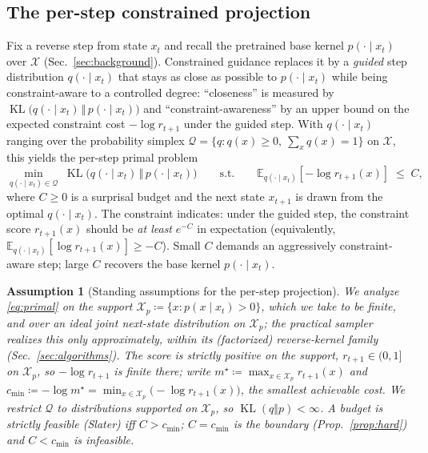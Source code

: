 \documentclass{article}
\newtheorem{assumption}{Assumption}
\DeclareMathOperator{\KL}{KL}
\newcommand{\E}{\mathbb{E}}
\newcommand{\X}{\mathcal{X}}
\newcommand{\Q}{\mathcal{Q}}
\begin{document}
\subsection{The per-step constrained projection}
\label{sec:perstep}
Fix a reverse step from state $x_t$ and recall the pretrained base kernel $p(\cdot\mid x_t)$ over $\X$ (Sec.~\ref{sec:background}). Constrained guidance replaces it by a \emph{guided} step distribution $q(\cdot\mid x_t)$ that stays as close as possible to $p(\cdot\mid x_t)$ while being constraint-aware to a controlled degree: ``closeness'' is measured by $\KL\big(q(\cdot\mid x_t)\,\Vert\,p(\cdot\mid x_t)\big)$ and ``constraint-awareness'' by an upper bound on the expected constraint cost $-\log r_{t+1}$ under the guided step. With $q(\cdot\mid x_t)$ ranging over the probability simplex $\Q=\{q:q(x)\ge0,\ \sum_x q(x)=1\}$ on $\X$, this yields the per-step primal problem
\begin{equation}
\label{eq:primal}
\min_{q(\cdot\mid x_t)\in\Q}\; \KL\big(q(\cdot\mid x_t)\,\big\Vert\, p(\cdot\mid x_t)\big)
\qquad\text{s.t.}\qquad
\E_{q(\cdot\mid x_t)}\!\left[-\log r_{t+1}(x)\right]\;\le\;C,
\end{equation}
where $C\ge 0$ is a surprisal budget and the next state $x_{t+1}$ is drawn from the optimal $q(\cdot\mid x_t)$. The constraint indicates: under the guided step, the constraint score $r_{t+1}(x)$ should be \emph{at least} $e^{-C}$ in expectation (equivalently, $\E_{q(\cdot\mid x_t)}[\log r_{t+1}(x)]\ge -C$). Small $C$ demands an aggressively constraint-aware step; large $C$ recovers the base kernel $p(\cdot\mid x_t)$.

\begin{assumption}[Standing assumptions for the per-step projection]
\label{ass:standing}
We analyze \eqref{eq:primal} on the support $\X_p\coloneqq\{x:p(x\mid x_t)>0\}$, which we take to be finite, and over an \emph{ideal joint} next-state distribution on $\X_p$; the practical sampler realizes this only approximately, within its (factorized) reverse-kernel family (Sec.~\ref{sec:algorithms}). The score is strictly positive on the support, $r_{t+1}\in(0,1]$ on $\X_p$, so $-\log r_{t+1}$ is finite there; write $m^\star\coloneqq\max_{x\in\X_p}r_{t+1}(x)$ and $c_{\min}\coloneqq-\log m^\star=\min_{x\in\X_p}\!\big(-\log r_{t+1}(x)\big)$, the smallest achievable cost. We restrict $\Q$ to distributions supported on $\X_p$, so $\KL(q\Vert p)<\infty$. A budget is \emph{strictly feasible} (Slater) iff $C>c_{\min}$; $C=c_{\min}$ is the boundary (Prop.~\ref{prop:hard}) and $C<c_{\min}$ is infeasible.
\end{assumption}
\end{document}

